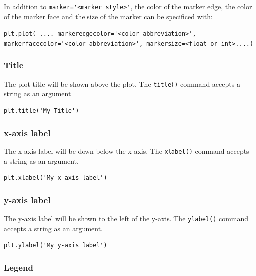 \documentclass{book}
\begin{document}
In addition to \lstinline!marker='<marker style>'!, the color of the
marker edge, the color of the marker face and the size of the marker can
be specificed with:

\lstinline!plt.plot( .... markeredgecolor='<color abbreviation>', markerfacecolor='<color abbreviation>', markersize=<float or int>....)!
    




    
        \subsubsection{Title}\label{title}

The plot title will be shown above the plot. The \lstinline!title()!
command accepts a string as an argument

\begin{lstlisting}
plt.title('My Title')
\end{lstlisting}
    




    
        \subsubsection{x-axis label}\label{x-axis-label}

The x-axis label will be down below the x-axis. The \lstinline!xlabel()!
command accepts a string as an argument.

\begin{lstlisting}
plt.xlabel('My x-axis label')
\end{lstlisting}
    




    
        \subsubsection{y-axis label}\label{y-axis-label}

The y-axis label will be shown to the left of the y-axis. The
\lstinline!ylabel()! command accepts a string as an argument.

\begin{lstlisting}
plt.ylabel('My y-axis label')
\end{lstlisting}
    




    
        \subsubsection{Legend}\label{legend}
\end{document}
